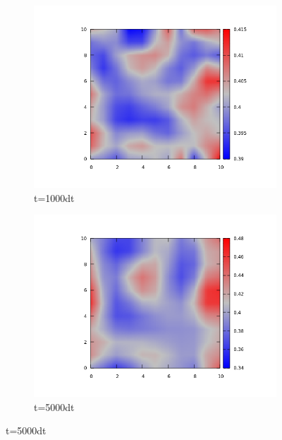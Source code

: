 \documentclass{article}
\begin{document}
\begin{figure}
\centering
\begin{subfigure}{.5\textwidth}
  \centering
  \includegraphics[width=1.0\linewidth]{1000per.png}
  \caption{t=1000dt}
  \label{fig:sub1}
\end{subfigure}%
\begin{subfigure}{.5\textwidth}
  \centering
  \includegraphics[width=1.0\linewidth]{5000per.png}
  \caption{t=5000dt}
  \label{fig:sub2}
\end{subfigure}
\label{fig:test}
\end{figure}

\vfill

\vfill
\clearpage
\end{document}
